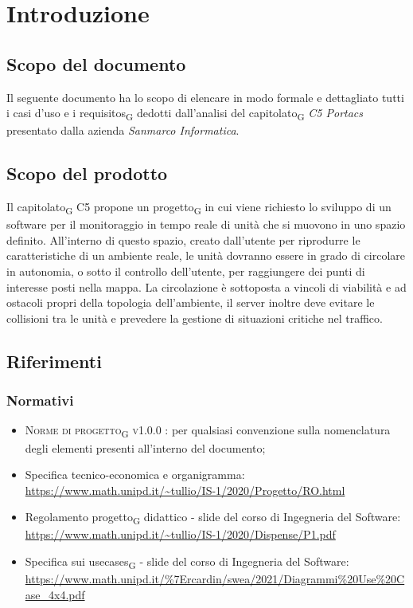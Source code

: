 \section{Introduzione}
\subsection{Scopo del documento}
Il seguente documento ha lo scopo di elencare in modo formale e dettagliato tutti i casi d’uso e i \glspl{requisito}\textsubscript{G} dedotti dall’analisi del \gls{capitolato}\textsubscript{G} \textit{C5 Portacs} presentato dalla azienda \textit{Sanmarco Informatica}.

\subsection{Scopo del prodotto}
Il \gls{capitolato}\textsubscript{G} C5 propone un \gls{progetto}\textsubscript{G} in cui viene richiesto lo sviluppo di un software per il monitoraggio in tempo reale di unità che si muovono in uno spazio definito. All’interno di questo spazio, creato dall’utente per riprodurre le caratteristiche di un ambiente reale, le unità dovranno essere in grado di circolare in autonomia, o sotto il controllo dell’utente, per raggiungere dei punti di interesse posti nella mappa.  La circolazione è sottoposta a vincoli di viabilità e ad ostacoli propri della topologia dell’ambiente, il server inoltre deve evitare le collisioni tra le unità e prevedere la gestione di situazioni critiche nel traffico.

\subsection{Riferimenti}
\subsubsection{Normativi}
\begin{itemize}
\item \textsc{Norme di \gls{progetto}\textsubscript{G} v1.0.0 }: per qualsiasi convenzione sulla nomenclatura degli elementi presenti all’interno del documento;
\item Specifica tecnico-economica e organigramma: \\ \url{https://www.math.unipd.it/~tullio/IS-1/2020/Progetto/RO.html}
\item Regolamento \gls{progetto}\textsubscript{G} didattico - slide del corso di Ingegneria del Software: \\ \url{https://www.math.unipd.it/~tullio/IS-1/2020/Dispense/P1.pdf}
\item Specifica sui \glspl{usecase}\textsubscript{G} - slide del corso di Ingegneria del Software: \\ \url{https://www.math.unipd.it/\%7Ercardin/swea/2021/Diagrammi\%20Use\%20Case_4x4.pdf}
\end{itemize}

